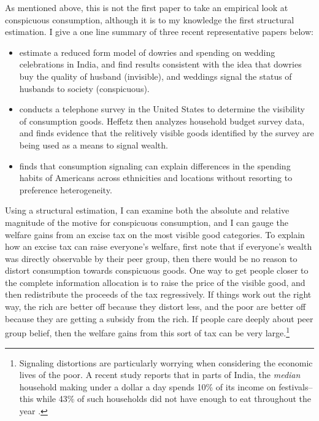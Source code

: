 \documentclass[12pt]{article}
\begin{document}
As mentioned above, this is not the first paper to take an empirical look at conspicuous consumption, although it is to my knowledge the first structural estimation.
I give a one line summary of three recent representative papers below:
\begin{itemize}
	\item \citet{Blochetal2004} estimate a reduced form model of dowries and spending on wedding celebrations in India, and find results consistent with the idea that dowries buy the quality of husband (invisible), and weddings signal the status of husbands to society (conspicuous).  
	\item \citet{Heffetz2011} conducts a telephone survey in the United States to determine the visibility of consumption goods.  Heffetz then analyzes household budget survey data, and finds evidence that the relitively visible goods identified by the survey are being used as a means to signal wealth. 
	\item \citet{Charlesetal2009} finds that consumption signaling can explain differences in the spending habits of Americans across ethnicities and locations without resorting to preference heterogeneity.
\end{itemize}

Using a structural estimation, I can examine both the absolute and relative magnitude of the motive for conspicuous consumption, and I can gauge the welfare gains from an excise tax on the most visible good categories.  To explain how an excise tax can raise everyone's welfare, first note that if everyone's wealth was directly observable by their peer group, then there would be no reason to distort consumption towards conspicuous goods.  One way to get people closer to the complete information allocation is to raise the price of the visible good, and then redistribute the proceeds of the tax regressively.  If things work out the right way, the rich are better off because they distort less, and the poor are better off because they are getting a subsidy from the rich.  If people care deeply about peer group belief, then the welfare gains from this sort of tax can be very large.\footnote{Signaling distortions are particularly worrying when considering the economic lives of the poor.  A recent study reports that in parts of India, the \emph{median} household making under a dollar a day spends 10\% of its income on festivals--this while 43\% of such households did not have enough to eat throughout the year \citep{BanerjeeDuflo2007}.  } 
\end{document}
